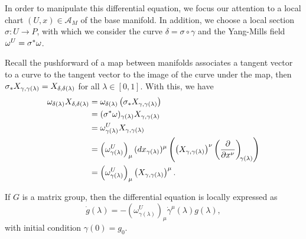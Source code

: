 In order to manipulate this differential equation, we focus our attention to a local chart \((U,x) \in \mathscr{A}_M\) of the base manifold. In addition, we choose a local section \(\sigma : U \to P\), with which we consider the curve \(\delta = \sigma \circ \gamma\) and the Yang-Mills field \(\omega^U = {\sigma}^{\ast}_{}\omega\).

Recall the pushforward of a map between manifolds associates a tangent vector to a curve to the tangent vector to the image of the curve under the map, then \({\sigma}_{\ast{}}{X_{\gamma,\gamma(\lambda)}} = X_{\delta,\delta(\lambda)}\) for all \(\lambda \in [0,1]\). With this, we have
\begin{align*}
    \omega_{\delta(\lambda)}X_{\delta, \delta(\lambda)} &= \omega_{\delta(\lambda)}\left(\pf{\sigma}{X_{\gamma,\gamma(\lambda)}}\right)\\
                                                        &= (\pb{\sigma}{\omega})_{\gamma(\lambda)}X_{\gamma,\gamma(\lambda)}\\
                                                        &= \omega^U_{\gamma(\lambda)}X_{\gamma,\gamma(\lambda)}\\
                                                        &= \left(\omega^U_{\gamma(\lambda)}\right)_\mu (dx_{\gamma(\lambda)})^\mu \left(\left(X_{\gamma, \gamma(\lambda)}\right)^\nu\bvec{x^\nu}{\gamma(\lambda)}\right)\\
                                                        &= \left(\omega^U_{\gamma(\lambda)}\right)_\mu \left(X_{\gamma,\gamma(\lambda)}\right)^\mu.
\end{align*}
\begin{corollary}
    If \(G\) is a matrix group, then the differential equation is locally expressed as
    \begin{equation*}
        \dot{g}(\lambda) = - \left(\omega_{\gamma(\lambda)}^{U}\right)_\mu \dot{\gamma}^\mu(\lambda) g(\lambda),
    \end{equation*}
    with initial condition \(\gamma(0) = g_0\).
\end{corollary}

